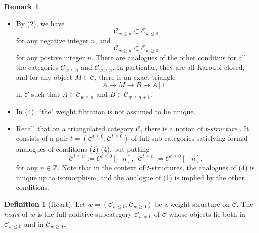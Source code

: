 \documentclass[11pt, a4paper]{amsart}
\theoremstyle{plain}
\theoremstyle{definition}
\newtheorem{definition}[theorem]{Definition}
\newtheorem{remark}[theorem]{Remark}
\numberwithin{equation}{section}
\def\ZZ{\mathbb{Z}}
\begin{document}
\begin{remark}
    \begin{itemize}
        \item By (2), we have 
        \begin{equation*}
            \mathcal{C}_{w \le n} \subset \mathcal{C}_{w \le 0}
        \end{equation*}
        for any negative integer $n$, and 
        \begin{equation*}
            \mathcal{C}_{w \ge n} \subset \mathcal{C}_{w \ge 0}
        \end{equation*}
        for any postive integer $n$. There are analogues of the other conditins for all the categories $\mathcal{C}_{w \le n}$ and $\mathcal{C}_{w \ge n}$. In particular, they are all Karoubi-closed, and for any object $M \in \mathcal{C}$, there is an exact triangle
        \begin{equation*}
            A \rightarrow M \rightarrow B \rightarrow A[1]
        \end{equation*}
        in $\mathcal{C}$ such that $A \in \mathcal{C}_{w \le n}$ and $B \in \mathcal{C}_{w \ge n + 1}$. 
        \item In (4), ``the" weight filtration is not assumed to be unique. 
        \item Recall that on a triangulated category $\mathcal{C}$, there is a notion of \textit{t-structure} \cite[D\'{e}f. 1.3.1]{BBD}. It consists of a pair $t = (\mathcal{C}^{t \le 0}, \mathcal{C}^{t \ge 0})$ of full sub-categories satisfying formal analogues of conditions (2)-(4), but putting 
        \begin{equation*}
            \mathcal{C}^{t \le n} := \mathcal{C}^{t \le 0}[-n], \, \, \, \mathcal{C}^{t \ge n} := \mathcal{C}^{t \ge 0}[-n],
        \end{equation*}
        for any $n \in \ZZ$. Note that in the context of $t$-structures, the analogues of (4) is unique up to isomorphism, and the analogue of (1) is implied by the other conditions. 
    \end{itemize}
\end{remark}

\begin{definition}[Heart] \cite[Definition 1.2.1]{Bondarko10}
    Let $w = (\mathcal{C}_{w \le 0}, \mathcal{C}_{w \ge 0})$ be a weight structure on $\mathcal{C}$. The \textit{heart} of $w$ is the full additive subcategory $\mathcal{C}_{w = 0}$ of $\mathcal{C}$ whose objects lie both in $\mathcal{C}_{w \le 0}$ and in $\mathcal{C}_{w \ge 0}$. 
\end{definition}
\end{document}
